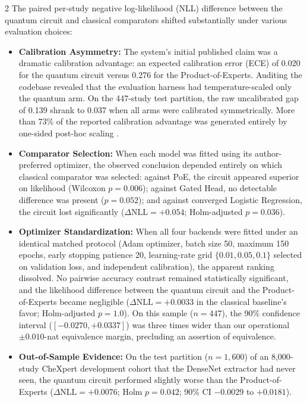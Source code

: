 \documentclass[10pt,a4paper,twoside]{article}
\begin{document}
\begin{multicols}{2}
The paired per-study negative log-likelihood (NLL) difference between the quantum circuit and classical comparators shifted substantially under various evaluation choices:
\begin{itemize}
  \setlength{\itemsep}{2pt}
  \setlength{\parskip}{0pt}
  \item \textbf{Calibration Asymmetry:} The system's initial published claim was a dramatic calibration advantage: an expected calibration error (ECE) of 0.020 for the quantum circuit versus 0.276 for the Product-of-Experts. Auditing the codebase revealed that the evaluation harness had temperature-scaled only the quantum arm. On the 447-study test partition, the raw uncalibrated gap of 0.139 shrank to 0.037 when all arms were calibrated symmetrically. More than 73\% of the reported calibration advantage was generated entirely by one-sided post-hoc scaling \cite{guo2017}.
  \item \textbf{Comparator Selection:} When each model was fitted using its author-preferred optimizer, the observed conclusion depended entirely on which classical comparator was selected: against PoE, the circuit appeared superior on likelihood (Wilcoxon $p = 0.006$); against Gated Head, no detectable difference was present ($p = 0.052$); and against converged Logistic Regression, the circuit lost significantly ($\Delta\text{NLL} = +0.054$; Holm-adjusted $p = 0.036$).
  \item \textbf{Optimizer Standardization:} When all four backends were fitted under an identical matched protocol (Adam optimizer, batch size 50, maximum 150 epochs, early stopping patience 20, learning-rate grid $\{0.01, 0.05, 0.1\}$ selected on validation loss, and independent calibration), the apparent ranking dissolved. No pairwise accuracy contrast remained statistically significant, and the likelihood difference between the quantum circuit and the Product-of-Experts became negligible ($\Delta\text{NLL} = +0.0033$ in the classical baseline's favor; Holm-adjusted $p = 1.0$). On this sample ($n=447$), the 90\% confidence interval ($[-0.0270, +0.0337]$) was three times wider than our operational $\pm 0.010$-nat equivalence margin, precluding an assertion of equivalence.
  \item \textbf{Out-of-Sample Evidence:} On the test partition ($n = 1,600$) of an 8,000-study CheXpert development cohort that the DenseNet extractor had never seen, the quantum circuit performed slightly worse than the Product-of-Experts ($\Delta\text{NLL} = +0.0076$; Holm $p = 0.042$; 90\% CI $-0.0029$ to $+0.0181$).

\end{itemize}
\end{multicols}
\end{document}
